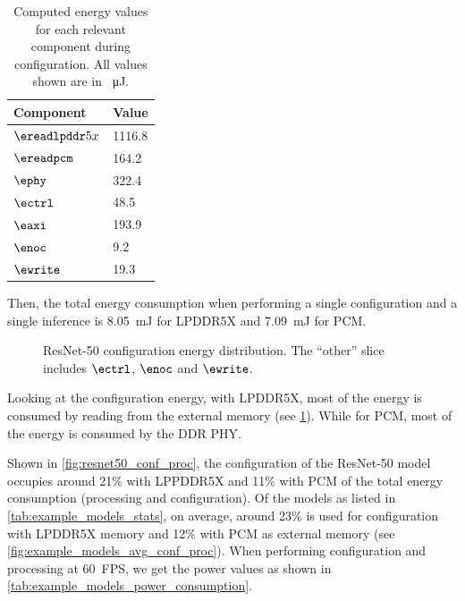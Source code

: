 \begin{table}[hbtp]
    \centering
    \begin{tabular}{@{}ll@{}}
    \toprule
    \textbf{Component} & \textbf{Value} \\
    \midrule
    $\ereadlpddr5x$ & 1116.8 \\
    $\ereadpcm$ & 164.2 \\
    $\ephy$ & 322.4 \\
    $\ectrl$ & 48.5 \\
    $\eaxi$ & 193.9 \\
    $\enoc$ & 9.2 \\
    $\ewrite$ & 19.3 \\
    \bottomrule
    \end{tabular}
    \caption{
        Computed energy values for each relevant component during configuration.
        All values shown are in \SI{}{\micro\joule}.
    }
    \label{tab:resnet50_energy}
\end{table}

Then, the total energy consumption when performing a single configuration and a single inference is \SI{8.05}{mJ} for LPDDR5X and \SI{7.09}{mJ} for PCM.

\begin{figure}[hbtp]
    \centering
    \hfill
    \caption{ResNet-50 configuration energy distribution. The ``other'' slice includes $\ectrl$, $\enoc$ and $\ewrite$.}
    \label{fig:resnet50_conf_energy_distribution}
\end{figure}

Looking at the configuration energy, with LPDDR5X, most of the energy is consumed by reading from the external memory (see \cref{fig:resnet50_conf_energy_distribution}).
While for PCM, most of the energy is consumed by the DDR PHY.

Shown in \cref{fig:resnet50_conf_proc}, the configuration of the ResNet-50 model occupies around 21\% with LPPDDR5X and 11\% with PCM of the total energy consumption (processing and configuration).
Of the models as listed in \cref{tab:example_models_stats}, on average, around 23\% is used for configuration with LPDDR5X memory and 12\% with PCM as external memory (see \cref{fig:example_models_avg_conf_proc}).
When performing configuration and processing at \SI{60}{FPS}, we get the power values as shown in \cref{tab:example_models_power_consumption}.

